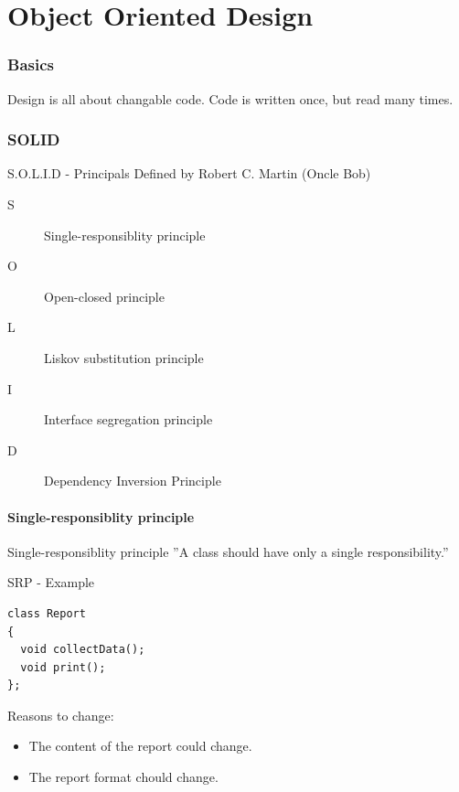 \documentclass{beamer}
\begin{document}
\part{Object Oriented Design}

\section{Basics}

\begin{frame}
Design is all about changable code.
Code is written once, but read many times.
\end{frame}


\section{SOLID}

\begin{frame}{S.O.L.I.D - Principals}
Defined by Robert C. Martin (Oncle Bob)

\begin{description}
\item [S] Single-responsiblity principle
\item [O] Open-closed principle
\item [L] Liskov substitution principle
\item [I] Interface segregation principle
\item [D] Dependency Inversion Principle
\end{description}
\end{frame}

\subsection{Single-responsiblity principle}

\begin{frame}[fragile]{Single-responsiblity principle}
''A class should have only a single responsibility.''
\end{frame}

\begin{frame}[fragile]{SRP - Example}
\begin{lstlisting}[caption=SRP Anti-Example]
class Report
{
  void collectData();
  void print();
};
\end{lstlisting}

\begin{block}{Reasons to change:}
\begin{itemize}
  \item The content of the report could change.
  \item The report format chould change.
\end{itemize}
\end{block}
\end{frame}
\end{document}
